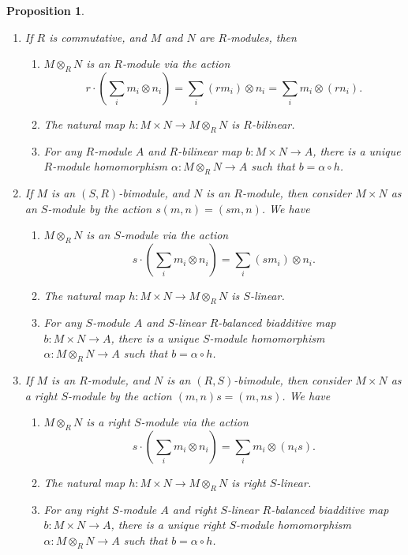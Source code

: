\documentclass{amsart}[12pt]
\numberwithin{equation}{section}
\theoremstyle{plain} %
\newtheorem{prop}[equation]{Proposition}
\theoremstyle{definition}
\theoremstyle{remark}
\begin{document}
\begin{prop} \begin{enumerate}
\item If $R$ is commutative, and $M$ and $N$ are $R$-modules, then
\begin{enumerate}
\item $M\otimes_R N$ is an $R$-module via the action
\[ r \cdot (\sum_i m_i \otimes n_i) = \sum_i (r m_i) \otimes n_i = \sum_i m_i \otimes (r n_i).\]
\item The natural map $h: M\times N \to M\otimes_R N$ is $R$-bilinear.
\item For any $R$-module $A$ and $R$-bilinear map $b: M\times N \to A$, there is a unique $R$-module homomorphism $\alpha: M\otimes_R N \to A$ such that $b=\alpha\circ h$.
\end{enumerate}
\item If $M$ is an $(S,R)$-bimodule, and $N$ is an $R$-module, then consider $M\times N$ as an $S$-module by the action $s (m,n) = (sm,n)$. We have
\begin{enumerate}
\item $M\otimes_R N$ is an $S$-module via the action
\[ s \cdot (\sum_i m_i \otimes n_i) = \sum_i (s m_i) \otimes n_i.\]
\item The natural map $h: M\times N \to M\otimes_R N$ is $S$-linear.
\item For any $S$-module $A$ and $S$-linear $R$-balanced biadditive map $b: M\times N \to A$, there is a unique $S$-module homomorphism $\alpha: M\otimes_R N \to A$ such that $b=\alpha\circ h$.
\end{enumerate}
\item If $M$ is an $R$-module, and $N$ is an $(R,S)$-bimodule, then consider $M\times N$ as a right $S$-module by the action $ (m,n)s = (m,ns)$. We have
\begin{enumerate}
\item $M\otimes_R N$ is a right $S$-module via the action
\[ s \cdot (\sum_i m_i \otimes n_i) = \sum_i m_i \otimes (n_i s).\]
\item The natural map $h: M\times N \to M\otimes_R N$ is right $S$-linear.
\item For any right $S$-module $A$ and right $S$-linear $R$-balanced biadditive map $b: M\times N \to A$, there is a unique right $S$-module homomorphism $\alpha: M\otimes_R N \to A$ such that $b=\alpha\circ h$.
\end{enumerate}
\end{enumerate}
\end{prop}
\end{document}
